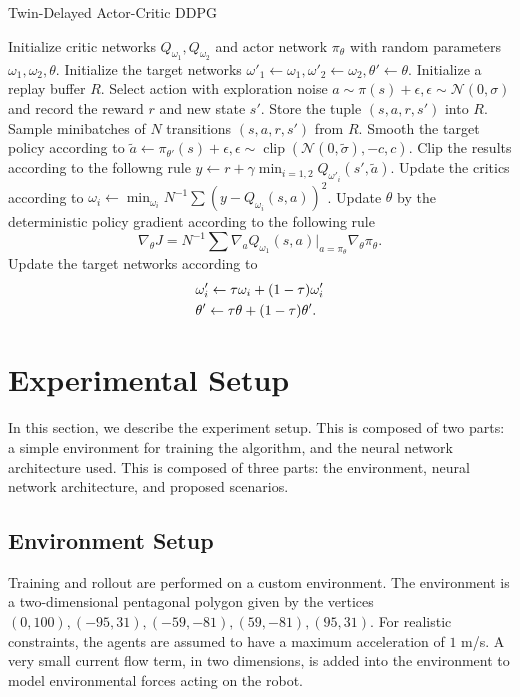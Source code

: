\documentclass[10pt,conference]{IEEEtran}
\DeclareMathOperator{\Clip}{clip}
\begin{document}
\begin{algorithm}
	\caption{Twin-Delayed Actor-Critic DDPG}
	\begin{algorithmic}[2]
		\STATE Initialize critic networks $Q_{\omega_1}, Q_{\omega_2}$ and actor network $\pi_{\theta}$ with random parameters
		$\omega_1, \omega_2, \theta$. 
		\STATE Initialize the target networks $\omega'_1 \leftarrow \omega_1, \omega'_2 \leftarrow \omega_2, \theta' \leftarrow \theta$.
		\STATE Initialize a replay buffer $R$.
			\STATE Select action with exploration noise $a \sim \pi(s) + \epsilon, \epsilon \sim \mathcal{N}(0, \sigma)$ and record the reward $r$ and new state $s'$. 
			\STATE Store the tuple $(s, a, r, s')$ into $R$. 
			\STATE Sample minibatches of $N$ transitions $(s, a, r, s')$ from $R$.
			\STATE Smooth the target policy according to $\tilde{a} \leftarrow \pi_{\theta'}(s) + \epsilon, \epsilon \sim \Clip(\mathcal{N}(0, \tilde{\sigma}), -c, c)$.
			\STATE Clip the results according to the followng rule $y \leftarrow r + \gamma \min_{i=1,2}Q_{\omega'_i}(s', \tilde{a})$. 
			\STATE Update the critics according to $\omega_i \leftarrow \min_{\omega_i}N^{-1}\sum(y - Q_{\omega_i}(s, a))^2$.
				\STATE Update $\theta$ by the deterministic policy gradient according to the following rule 
				\begin{equation*}
					\displaystyle \nabla_{\theta}J = N^{-1}\sum\nabla_a Q_{\omega_1}(s,a)\big|_{a = \pi_{\theta}}\nabla_{\theta}\pi_{\theta}.
				\end{equation*}
				\STATE Update the target networks according to 
				\begin{align*}
					\displaystyle &\omega'_i \leftarrow \tau\omega_i + (1-\tau)\omega'_i \\
					&\theta' \leftarrow \tau\theta + (1-\tau)\theta'.
				\end{align*}
			\ENDIF 
		\ENDFOR
	\end{algorithmic}
	\label{sacddpg}	
\end{algorithm}
\section{Experimental Setup}
In this section, we describe the experiment setup. This is composed of two parts: a simple environment for training the algorithm, and the neural network architecture used. This is composed of three parts: the environment, neural network architecture, and proposed scenarios. 
\subsection{Environment Setup}
Training and rollout are performed on a custom environment. The environment is a two-dimensional pentagonal polygon given by the vertices $(0,100), (-95,31), (-59,-81), (59,-81), (95,31)$. For realistic constraints, the agents are assumed to have a maximum acceleration of $1$ m/s. A very small current flow term, in two dimensions, is added into the environment to model environmental forces acting on the robot. 
\end{document}
